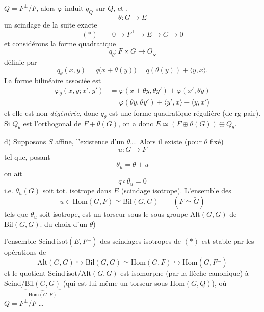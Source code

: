 \documentclass[11pt,a4paper]{article}
\begin{document}
  $Q=F^{\perp}/F$, alors $\varphi$ induit  $q_Q$ sur $Q$, et  .  
\[
\theta : G \longrightarrow E
\]
un scindage de la suite exacte
\[
(*)\qquad 0\longrightarrow F^{\perp} \longrightarrow E \longrightarrow G \longrightarrow 0
\]
et considérons la forme quadratique
\[
q_\theta : F\times G \longrightarrow \underline{O}_S
\]
définie par
\[
q_\theta(x,y) = q\bigl(x+\theta(y)\bigr) = q(\theta(y)) + \langle y,x\rangle .
\]
La forme bilinéaire associée est
\[
\begin{aligned}
\varphi_\theta(x,y;x',y') &= \varphi(x+\theta y,\theta y') + \varphi(x',\theta y)\\
&= \varphi(\theta y,\theta y') + \langle y',x\rangle + \langle y,x'\rangle
\end{aligned}
\]
et elle est non \emph{dégénérée}, donc $q_\theta$ est une
forme quadratique régulière (de rg pair). Si $Q_\theta$
est l'orthogonal de $F+\theta(G)$, on a donc
$E \simeq (F\oplus\theta(G))\oplus Q_\theta$.

d) Supposons $S$ affine,   l'existence
d'un $\theta$…. Alors il existe (pour $\theta$ fixé)
\[
u : G \longrightarrow F
\]
tel que, posant
\[
\theta_u = \theta + u
\]
on ait
\[
q\circ\theta_u = 0
\]
i.e. $\theta_u(G)$ soit tot. isotrope dans $E$ (scindage isotrope). L'ensemble des
\[
u \in \mathrm{Hom}(G,F) \simeq \mathrm{Bil}(G,G) \qquad (F\simeq\check G)
\]
tels que  $\theta_u$ soit isotrope, est un torseur
sous le sous-groupe $\mathrm{Alt}(G,G)$ de $\mathrm{Bil}(G,G)$.
  du choix d'un $\theta$)

l'ensemble $\mathrm{Scind\,isot}(E,F^{\perp})$ des scindages isotropes de $(*)$ est
stable par les opérations de
\[
\mathrm{Alt}(G,G) \hookrightarrow \mathrm{Bil}(G,G) \simeq \mathrm{Hom}(G,F) \hookrightarrow \mathrm{Hom}(G,F^{\perp})
\]
et le quotient $\mathrm{Scind\,isot}/\mathrm{Alt}(G,G)$ est isomorphe (par la flèche
canonique) à $\mathrm{Scind}/\underbrace{\mathrm{Bil}(G,G)}_{\mathrm{Hom}(G,F)}$ (qui est lui-même un
torseur sous $\mathrm{Hom}(G,Q)$), où $Q=F^{\perp}/F$ …
\end{document}

